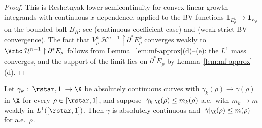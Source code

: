 \begin{proof}
This is Reshetnyak lower semicontinuity for convex linear-growth integrands
with continuous $x$-dependence, applied to the BV functions $\mathbf 1_{E^k_
\rho}\to\mathbf 1_{E_\rho}$ on the bounded ball $B_R$: see
\cite[Thm.~2.38]{AFP2000} (continuous-coefficient case) and
\cite[Thm.~2.39]{AFP2000} (weak strict BV convergence). The fact that
$V^k_\rho\,\mathcal H^{n-1}\restriction\partial^*E^k_\rho$ converges
weakly to $\Vrho\,\mathcal H^{n-1}\restriction\partial^*E_\rho$ follows
from Lemma~\ref{lem:mf-approx}(d)--(e): the $L^1$ mass converges, and the
support of the limit lies on $\partial^*E_\rho$ by Lemma~\ref{lem:mf-approx}(d).
\end{proof}

\begin{lemma}\label{lem:mf-AGS}
Let $\gamma_k:[\rstar,1]\to\X$ be absolutely continuous curves with
$\gamma_k(\rho)\to\gamma(\rho)$ in $\X$ for every $\rho\in[\rstar,1]$,
and suppose $|\dot\gamma_k|_\X(\rho)\le m_k(\rho)$ a.e.\ with $m_k\to m$
weakly in $L^1([\rstar,1])$. Then $\gamma$ is absolutely continuous and
$|\dot\gamma|_\X(\rho)\le m(\rho)$ for a.e.~$\rho$.
\end{lemma}

